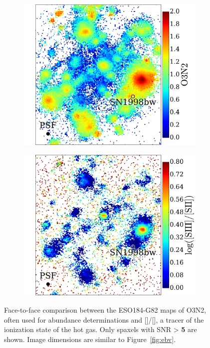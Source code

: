 \documentclass[traditabstract]{aa}
\newcommand{\sii}{[\ion{S}{ii}]}
\newcommand{\siii}{[\ion{S}{iii}]}
\begin{document}
\begin{figure}
\centering
\begin{subfigure}{.4\textwidth}
  \includegraphics[width=0.999\linewidth]{Figs/MUSE_SN1998bw_O3N2.pdf}
\end{subfigure}
\begin{subfigure}{.417\textwidth}
  \includegraphics[width=0.999\linewidth]{Figs/MUSE_SN1998bw_S3S2.pdf}
\end{subfigure}
\caption{Face-to-face comparison between the ESO184-G82 maps of O3N2, often used for abundance determinations and \siii/\sii, a tracer of the ionization state of the hot gas. Only spaxels with SNR > \textbf{5} are shown. Image dimensions are similar to Figure~\ref{fig:ebv}.}
\label{fig:s3s2}
\end{figure}
\end{document}

